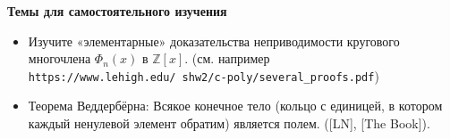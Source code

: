\documentclass[a4paper, 11pt]{article}
\begin{document}

\noindent\textbf{Темы для самостоятельного изучения}
\begin{itemize}[topsep=0pt]
    \item Изучите «элементарные» доказательства неприводимости кругового многочлена $\Phi_n(x)$ в $\mathbb{Z}[x]$.
    (см. например\\ \texttt{https://www.lehigh.edu/~shw2/c-poly/several\_proofs.pdf})
    \item Теорема Веддербёрна: Всякое конечное тело (кольцо с единицей, в котором каждый ненулевой элемент обратим) является полем. ([LN], [The Book]).
\end{itemize}
\end{document}
